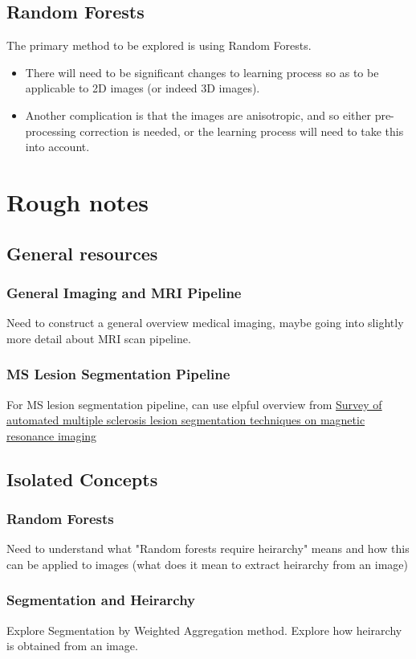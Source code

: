 \documentclass{report}
\begin{document}
\section{Random Forests}
The primary method to be explored is using Random Forests.
\begin{itemize}
	\item There will need to be significant changes to learning process so as to be applicable to 2D images (or indeed 3D images). 
	\item Another complication is that the images are anisotropic, and so either pre-processing correction is needed, or the learning process will need to take this into account.
\end{itemize}
\chapter{Rough notes}
\section{General resources}
\subsection{General Imaging and MRI Pipeline}
Need to construct a general overview medical imaging, maybe going into slightly more detail about MRI scan pipeline. 
\subsection{MS Lesion Segmentation Pipeline}
For MS lesion segmentation pipeline, can use elpful overview from \href{https://pdf.sciencedirectassets.com/271303/1-s2.0-S0895611118X00081/1-s2.0-S0895611118303227/main.pdf}{Survey of automated multiple sclerosis lesion segmentation
techniques on magnetic resonance imaging}
\section{Isolated Concepts}
\subsection{Random Forests}
Need to understand what "Random forests require heirarchy" means and how this can be applied to images (what does it mean to extract heirarchy from an image)
\subsection{Segmentation and Heirarchy}
Explore Segmentation by Weighted Aggregation method. Explore how heirarchy is obtained from an image.
\end{document}
